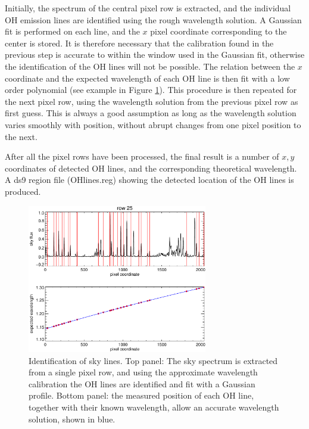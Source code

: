 \documentclass[a4paper, notitlepage]{article}
\begin{document}
Initially, the spectrum of the central pixel row is extracted, and the individual OH emission lines are identified using the rough wavelength solution. A Gaussian fit is performed on each line, and the $x$ pixel coordinate corresponding to the center is stored. It is therefore necessary that the calibration found in the previous step is accurate to within the window used in the Gaussian fit, otherwise the identification of the OH lines will not be possible. The relation between the $x$ coordinate and the expected wavelength of each OH line is then fit with a low order polynomial (see example in Figure \ref{fig:speclines}). This procedure is then repeated for the next pixel row, using the wavelength solution from the previous pixel row as first guess. This is always a good assumption as long as the wavelength solution varies smoothly with position, without abrupt changes from one pixel position to the next.

After all the pixel rows have been processed, the final result is a number of $x,y$ coordinates of detected OH lines, and the corresponding theoretical wavelength. A ds9 region file (OHlines.reg) showing the detected location of the OH lines is produced.


\begin{figure}[tbp]
\centering
\includegraphics[width=0.7\textwidth]{wavecal_accurate}
\caption{Identification of sky lines. Top panel: The sky spectrum is extracted from a single pixel row, and using the approximate wavelength calibration the OH lines are identified and fit with a Gaussian profile. Bottom panel: the measured position of each OH line, together with their known wavelength, allow an accurate wavelength solution, shown in blue.}
\label{fig:speclines}
\end{figure}


\end{document}
